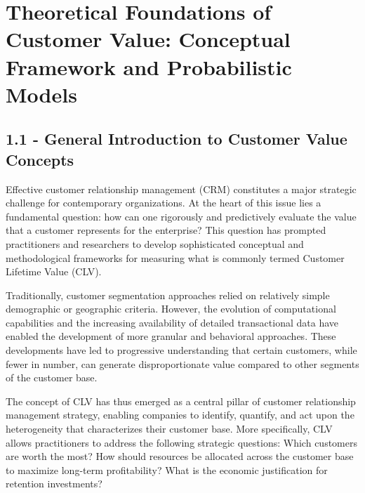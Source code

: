\documentclass[12pt,a4paper,oneside]{report}
\begin{document}


\chapter{Theoretical Foundations of Customer Value: Conceptual Framework and Probabilistic Models}

\section{1.1 - General Introduction to Customer Value Concepts}

Effective customer relationship management (CRM) constitutes a major strategic challenge for contemporary organizations. At the heart of this issue lies a fundamental question: how can one rigorously and predictively evaluate the value that a customer represents for the enterprise? This question has prompted practitioners and researchers to develop sophisticated conceptual and methodological frameworks for measuring what is commonly termed Customer Lifetime Value (CLV).

Traditionally, customer segmentation approaches relied on relatively simple demographic or geographic criteria. However, the evolution of computational capabilities and the increasing availability of detailed transactional data have enabled the development of more granular and behavioral approaches. These developments have led to progressive understanding that certain customers, while fewer in number, can generate disproportionate value compared to other segments of the customer base.

The concept of CLV has thus emerged as a central pillar of customer relationship management strategy, enabling companies to identify, quantify, and act upon the heterogeneity that characterizes their customer base. More specifically, CLV allows practitioners to address the following strategic questions: Which customers are worth the most? How should resources be allocated across the customer base to maximize long-term profitability? What is the economic justification for retention investments?

\end{document}
